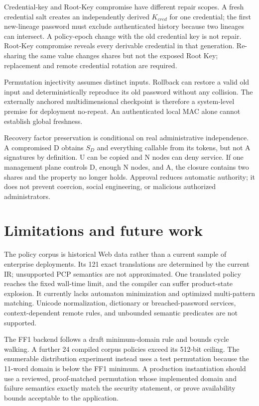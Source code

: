 \documentclass[preprint,12pt]{elsarticle}
\begin{document}
Credential-key and Root-Key compromise have different repair scopes. A fresh
credential salt creates an independently derived $K_{cred}$ for one credential;
the first new-lineage password must exclude authenticated history because two
lineages can intersect. A policy-epoch change with the old credential key is
not repair. Root-Key compromise reveals every derivable credential in that
generation. Re-sharing the same value changes shares but not the exposed Root
Key; replacement and remote credential rotation are required.

Permutation injectivity assumes distinct inputs. Rollback can restore a valid
old input and deterministically reproduce its old password without any
collision. The externally anchored multidimensional checkpoint is therefore a
system-level premise for deployment no-repeat. An authenticated local MAC alone
cannot establish global freshness.

Recovery factor preservation is conditional on real administrative
independence. A compromised D obtains $S_D$ and everything callable from its
tokens, but not A signatures by definition. U can be copied and N nodes can
deny service. If one management plane controls D, enough N nodes, and A, the
closure contains two shares and the property no longer holds. Approval reduces
automatic authority; it does not prevent coercion, social engineering, or
malicious authorized administrators.

\section{Limitations and future work}

The policy corpus is historical Web data rather than a current sample of
enterprise deployments. Its 121 exact translations are determined by the
current IR; unsupported PCP semantics are not approximated. One translated
policy reaches the fixed wall-time limit, and the compiler can suffer
product-state explosion. It currently lacks
automaton minimization and optimized multi-pattern matching. Unicode
normalization, dictionary or breached-password services, context-dependent
remote rules, and unbounded semantic predicates are not supported.

The FF1 backend follows a draft minimum-domain rule and bounds cycle walking.
A further 24 compiled corpus policies exceed its 512-bit ceiling. The
enumerable distribution experiment instead uses a test permutation because the
11-word domain is below the FF1 minimum.
A production instantiation should use a reviewed, proof-matched permutation
whose implemented domain and failure semantics exactly match the security
statement, or prove availability bounds acceptable to the application.
\end{document}

